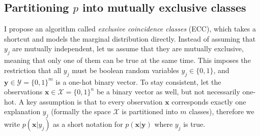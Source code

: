 \documentclass[12pt]{article}
\begin{document}
\subsection{Partitioning $p$ into mutually exclusive classes}

I  propose an algorithm called \textit{exclusive coincidence classes} (ECC), which takes a shortcut and models the marginal distribution directly.
Instead of assuming that $y_j$ are mutually independent, let us assume that they are mutually exclusive, meaning that only one of them can be true at the same time. This imposes the restriction that all $y_j$ must be boolean random variables $y_j\in\{0,1\}$, and $\boldsymbol{y} \in \mathcal{Y} = \{0,1\}^m$ is a one-hot binary vector. To stay consistent, let the observations $\boldsymbol{x}\in \mathcal{X} = \{0,1\}^n$ be a binary vector as well, but not necessarily one-hot. A key assumption is that to every observation $\boldsymbol{x}$ corresponds exactly one explanation $y_j$ (formally the space $\mathcal{X}$ is partitioned into $m$ classes), therefore we write $p(\boldsymbol{x}|y_j)$ as a short notation for $p(\boldsymbol{x}|\boldsymbol{y})$ where $y_j$ is true.
\end{document}
